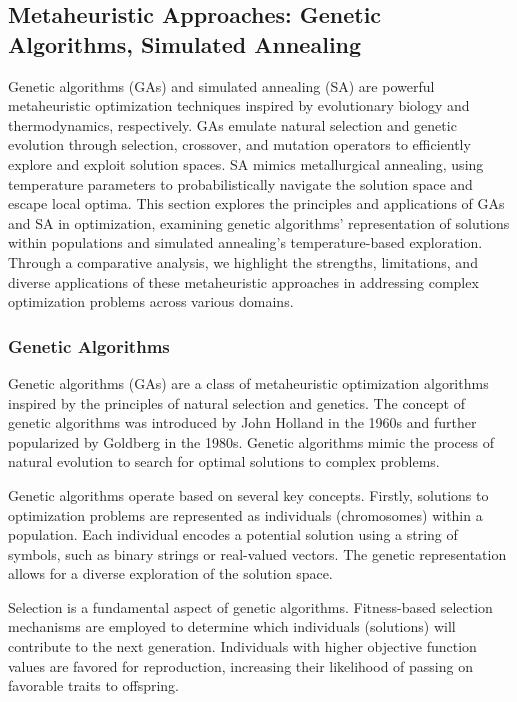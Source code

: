 \documentclass[11pt]{report}
\begin{document}
        \subsection{Metaheuristic Approaches: Genetic Algorithms, Simulated Annealing}
        Genetic algorithms (GAs) and simulated annealing (SA) are powerful metaheuristic optimization techniques inspired by evolutionary biology and thermodynamics, respectively. GAs emulate natural selection and genetic evolution through selection, crossover, and mutation operators to efficiently explore and exploit solution spaces. SA mimics metallurgical annealing, using temperature parameters to probabilistically navigate the solution space and escape local optima. This section explores the principles and applications of GAs and SA in optimization, examining genetic algorithms' representation of solutions within populations and simulated annealing's temperature-based exploration. Through a comparative analysis, we highlight the strengths, limitations, and diverse applications of these metaheuristic approaches in addressing complex optimization problems across various domains.

        \subsubsection{Genetic Algorithms}
        Genetic algorithms (GAs) are a class of metaheuristic optimization algorithms inspired by the principles of natural selection and genetics. The concept of genetic algorithms was introduced by John Holland in the 1960s and further popularized by Goldberg in the 1980s. Genetic algorithms mimic the process of natural evolution to search for optimal solutions to complex problems.

        Genetic algorithms operate based on several key concepts. Firstly, solutions to optimization problems are represented as individuals (chromosomes) within a population. Each individual encodes a potential solution using a string of symbols, such as binary strings or real-valued vectors. The genetic representation allows for a diverse exploration of the solution space.
        
        Selection is a fundamental aspect of genetic algorithms. Fitness-based selection mechanisms are employed to determine which individuals (solutions) will contribute to the next generation. Individuals with higher objective function values are favored for reproduction, increasing their likelihood of passing on favorable traits to offspring.
        
\end{document}
